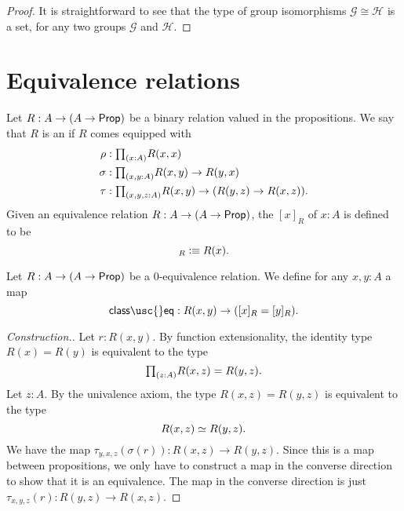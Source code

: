 \begin{proof}
It is straightforward to see that the type of group isomorphisms $\mathcal{G}\cong\mathcal{H}$ is a set, for any two groups $\mathcal{G}$ and $\mathcal{H}$.
\end{proof}

\section{Equivalence relations}

\begin{defn}\label{defn:eq_rel}
Let $R:A\to (A\to\mathsf{Prop})$ be a binary relation valued in the propositions. We say that $R$ is an  if $R$ comes equipped with
\begin{align*}
\rho & : \prd{x:A}R(x,x) \\
\sigma & : \prd{x,y:A} R(x,y)\to R(y,x) \\
\tau & : \prd{x,y,z:A} R(x,y)\to (R(y,z)\to R(x,z)).
\end{align*}
Given an equivalence relation $R:A\to (A\to\mathsf{Prop})$, the  $[x]_R$ of $x:A$ is defined to be
\begin{equation*}
[x]_R\defeq R(x).
\end{equation*}
\end{defn}

\begin{defn}
Let $R:A\to (A\to\mathsf{Prop})$ be a $0$-equivalence relation. 
We define for any $x,y:A$ a map
\begin{equation*}
\mathsf{class\usc{}eq}:R(x,y)\to ([x]_R=[y]_R).
\end{equation*}
\end{defn}

\begin{proof}[Construction.]
Let $r:R(x,y)$. By function extensionality, the identity type $R(x)=R(y)$ is equivalent to the type
\begin{equation*}
\prd{z:A}R(x,z)=R(y,z).
\end{equation*}
Let $z:A$. By the univalence axiom, the type $R(x,z)=R(y,z)$ is equivalent to the type
\begin{equation*}
\eqv{R(x,z)}{R(y,z)}.
\end{equation*}
We have the map $\tau_{y,x,z}(\sigma(r)):R(x,z)\to R(y,z)$. Since this is a map between propositions, we only have to construct a map in the converse direction to show that it is an equivalence. The map in the converse direction is just $\tau_{x,y,z}(r):R(y,z)\to R(x,z)$. 
\end{proof}

